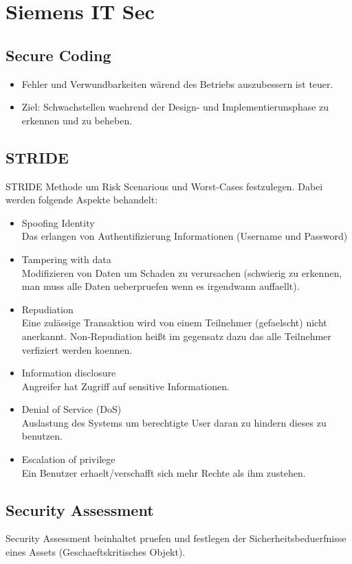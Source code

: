 \documentclass[a4paper, 12pt]{article}
\begin{document}
\section{Siemens IT Sec}
	\subsection{Secure Coding}
		\begin{itemize}
			\item Fehler und Verwundbarkeiten wärend des Betriebs auszubessern ist teuer.
			\item Ziel: Schwachstellen waehrend der Design- und Implementierunsphase zu erkennen und zu beheben.
		\end{itemize}
	\subsection{STRIDE}
	STRIDE Methode um Risk Scenarious und Worst-Cases festzulegen. Dabei werden folgende Aspekte behandelt:
	\begin{itemize}
		\item Spoofing Identity \\
		Das erlangen von Authentifizierung Informationen (Username und Password)
		\item Tampering with data \\
		Modifizieren von Daten um Schaden zu verursachen (schwierig zu erkennen, man muss alle Daten ueberpruefen wenn es irgendwann auffaellt).
		\item Repudiation \\
		Eine zulässige Transaktion wird von einem Teilnehmer (gefaelscht) nicht anerkannt.
		Non-Repudiation heißt im gegensatz dazu das alle Teilnehmer verfiziert werden koennen.
		\item Information disclosure \\
		Angreifer hat Zugriff auf sensitive Informationen.
		\item Denial of Service (DoS) \\
		Auslastung des Systems um berechtigte User daran zu hindern dieses zu benutzen.
		\item Escalation of privilege \\
		Ein Benutzer erhaelt/verschafft sich mehr Rechte als ihm zustehen.
	\end{itemize}
	\subsection{Security Assessment}
	Security Assessment beinhaltet pruefen und festlegen der Sicherheitsbeduerfnisse eines Assets (Geschaeftskritisches Objekt). \\
\end{document}
